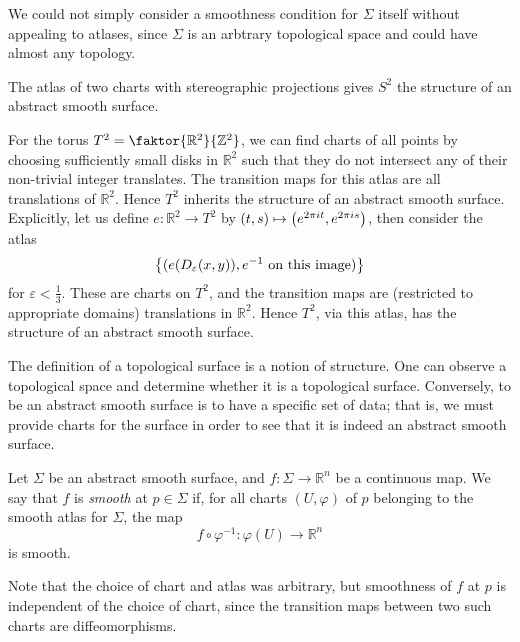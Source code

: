 \begin{remark}
	We could not simply consider a smoothness condition for \( \Sigma \) itself without appealing to atlases, since \( \Sigma \) is an arbtrary topological space and could have almost any topology.
\end{remark}
\begin{example}
	The atlas of two charts with stereographic projections gives \( S^2 \) the structure of an abstract smooth surface.
\end{example}
\begin{example}
	For the torus \( T^2 = \faktor{\mathbb R^2}{\mathbb Z^2} \), we can find charts of all points by choosing sufficiently small disks in \( \mathbb R^2 \) such that they do not intersect any of their non-trivial integer translates.
	The transition maps for this atlas are all translations of \( \mathbb R^2 \).
	Hence \( T^2 \) inherits the structure of an abstract smooth surface.
	Explicitly, let us define \( e \colon \mathbb R^2 \to T^2 \) by \( (t,s) \mapsto \qty(e^{2\pi i t}, e^{2 \pi i s}) \), then consider the atlas
	\[ \qty{(e\qty(D_\varepsilon(x,y)), e^{-1} \text{ on this image})} \]
	for \( \varepsilon < \frac{1}{3} \).
	These are charts on \( T^2 \), and the transition maps are (restricted to appropriate domains) translations in \( \mathbb R^2 \).
	Hence \( T^2 \), via this atlas, has the structure of an abstract smooth surface.
\end{example}
\begin{remark}
	The definition of a topological surface is a notion of structure.
	One can observe a topological space and determine whether it is a topological surface.
	Conversely, to be an abstract smooth surface is to have a specific set of data; that is, we must provide charts for the surface in order to see that it is indeed an abstract smooth surface.
\end{remark}
\begin{definition}
	Let \( \Sigma \) be an abstract smooth surface, and \( f \colon \Sigma \to \mathbb R^n \) be a continuous map.
	We say that \( f \) is \textit{smooth} at \( p \in \Sigma \) if, for all charts \( (U, \varphi) \) of \( p \) belonging to the smooth atlas for \( \Sigma \), the map
	\[ f \circ \varphi^{-1} \colon \varphi(U) \to \mathbb R^n \]
	is smooth.
\end{definition}
\begin{remark}
	Note that the choice of chart and atlas was arbitrary, but smoothness of \( f \) at \( p \) is independent of the choice of chart, since the transition maps between two such charts are diffeomorphisms.
\end{remark}
